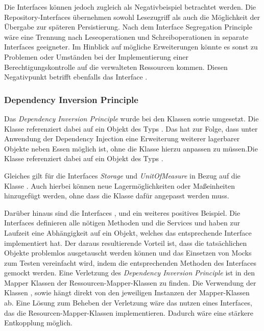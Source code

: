 Die Interfaces können jedoch zugleich als Negativbeispiel betrachtet werden.
Die Repository-Interfaces übernehmen sowohl Lesezugriff als auch die Möglichkeit der Übergabe zur späteren Persistierung.
Nach dem Interface Segregation Principle wäre eine Trennung nach Leseoperationen und Schreiboperationen in separate Interfaces geeigneter.
Im Hinblick auf mögliche Erweiterungen könnte es sonst zu Problemen oder Umständen bei der Implementierung einer Berechtigungskontrolle auf die verwalteten Ressourcen kommen.
Diesen Negativpunkt betrifft ebenfalls das Interface \href{}{\code{}}.


\subsubsection*{Dependency Inversion Principle}
Das \textit{Dependency Inversion Principle} wurde bei den Klassen \href{}{\code{}} sowie \href{}{\code{}} umgesetzt.
Die Klasse \href{}{\code{}} referenziert dabei auf ein Objekt des Typs \href{}{\code{}}. 
Das hat zur Folge, dass unter Anwendung der Dependency Injection eine Erweiterung weiterer lagerbarer Objekte neben Essen möglich ist, ohne die Klasse \href{}{\code{}} hierzu anpassen zu müssen.Die Klasse \href{}{\code{}} referenziert dabei auf ein Objekt des Typs \href{}{\code{}}.

Gleiches gilt für die Interfaces \textit{Storage} und \textit{UnitOfMeasure} in Bezug auf die Klasse .
Auch hierbei können neue Lagermöglichkeiten oder Maßeinheiten hinzugefügt werden, ohne dass die Klasse  dafür angepasst werden muss.

Darüber hinaus sind die Interfaces \href{}{\code{}}, \href{}{\code{}} und \href{}{\code{}} ein weiteres positives Beispiel.
Die Interfaces definieren alle nötigen Methoden und die Services \href{}{\code{}} und \href{}{\code{}} haben zur Laufzeit eine Abhängigkeit auf ein Objekt, welches das entsprechende Interface implementiert hat.
Der daraus resultierende Vorteil ist, dass die tatsächlichen Objekte problemlos ausgetauscht werden können und das Einsetzen von Mocks zum Testen vereinfacht wird, indem die entsprechenden Methoden des Interfaces gemockt werden.
Eine Verletzung des \textit{Dependency Inversion Principle} ist in den Mapper Klassen der Ressourcen-Mapper-Klassen zu finden. Die Verwendung der Klassen \href{}{\code{}}, \href{}{\code{}} sowie \href{}{\code{}} hängt direkt von den jeweiligen Instanzen der Mapper-Klassen ab.
Eine Lösung zum Beheben der Verletzung wäre das nutzen eines Interfaces, das die Resourcen-Mapper-Klassen implementieren.
Dadurch wäre eine stärkere Entkopplung möglich.

